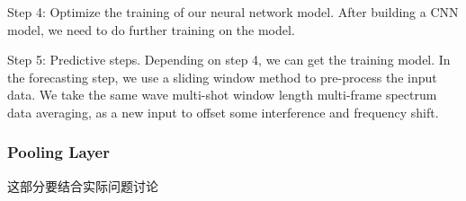 Step 4: Optimize the training of our neural network model. After building a CNN model, we need to do further training on the model.

Step 5: Predictive steps. Depending on step 4, we can get the training model. In the forecasting step, we use a sliding window method to pre-process the input data. We take the same wave multi-shot window length multi-frame spectrum data averaging, as a new input to offset some interference and frequency shift.

\subsubsection{Pooling Layer}

这部分要结合实际问题讨论




